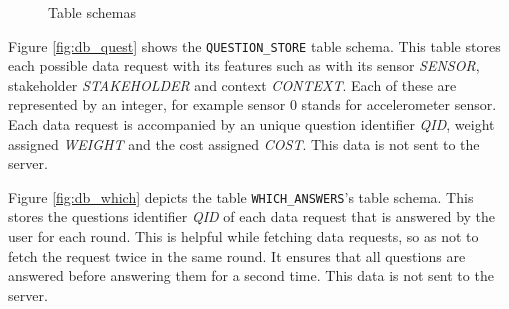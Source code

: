 \begin{figure}[htp]
\hspace{1em}
\caption{Table schemas}
\label{fig:ts1}
\end{figure}

Figure \ref{fig:db_quest} shows the \texttt{QUESTION\_STORE} table schema. This table stores each possible data request with its features such as with its sensor \textit{SENSOR}, stakeholder \textit{STAKEHOLDER} and context \textit{CONTEXT}. Each of these are represented by an integer, for example sensor 0 stands for accelerometer sensor. Each data request is accompanied by
an unique question identifier \textit{QID}, weight assigned \textit{WEIGHT} and the cost assigned \textit{COST}. This data is not sent to 
the server.

Figure \ref{fig:db_which} depicts the table \texttt{WHICH\_ANSWERS}'s table schema. This stores the questions identifier \textit{QID} of each data request that is answered by the user for each round. This is helpful while fetching data requests, so as not to fetch the request twice in the same round. It ensures that all questions are answered before answering them for a second time. This data is not sent to the server.

